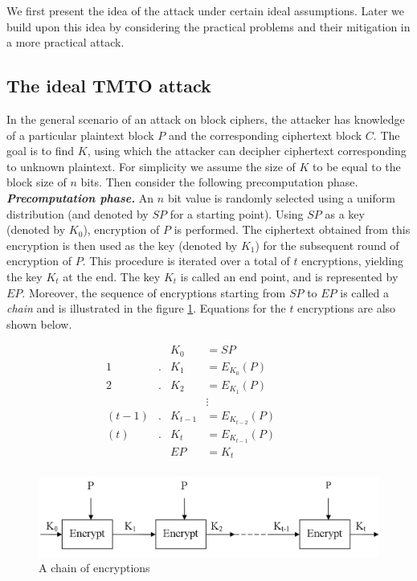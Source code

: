 We first present the idea of the attack under certain ideal assumptions. Later we build upon this idea by considering the practical problems and their mitigation in a more practical attack.

\subsection{The ideal TMTO attack}
In the general scenario of an attack on block ciphers, the attacker has knowledge of a particular plaintext block $P$ and the corresponding ciphertext block $C$. The goal is to find $K$, using which the attacker can decipher ciphertext corresponding to unknown plaintext. For simplicity we assume the size of $K$ to be equal to the block size of $n$ bits. Then consider the following precomputation phase.\\

\noindent \textit{\textbf{Precomputation phase.}} An $n$ bit value is randomly selected using a uniform distribution (and denoted by $SP$ for a starting point). Using $SP$ as a key (denoted by $K_0$), encryption of $P$ is performed. The ciphertext obtained from this encryption is then used as the key (denoted by $K_1$) for the subsequent round of encryption of $P$. This procedure is iterated over a total of $t$ encryptions, yielding the key $K_t$ at the end. The key $K_t$ is called an end point, and is represented by $EP$. Moreover, the sequence of encryptions starting from $SP$ to $EP$ is called a \emph{chain} and is illustrated in the figure \ref{fig:block-cipher-single-chain}. Equations for the $t$ encryptions are also shown below. 

\begin{align*}
& & K_0 &= SP & & & &\\
1&. & K_1 &= E_{K_0}(P) & & & &\\
2&. & K_2 &= E_{K_1}(P) & & & &\\
& & &\vdots & & & &\\
(t-1)&. &K_{t-1} &= E_{K_{t-2}}(P) & & & &\\
(t)&. &K_{t} &= E_{K_{t-1}}(P) & & & &\\
& & EP &= K_{t} & & & &\\
\end{align*}

\begin{figure}[ht!]
	\centering
		\includegraphics[width=5.5in]{./figures/block-cipher-single-chain.PNG}
	\caption{A chain of encryptions}	
	\label{fig:block-cipher-single-chain}
\end{figure}

